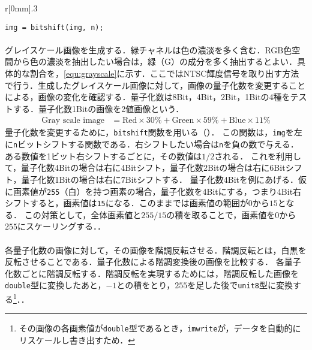\begin{wrapfigure}{r}[0mm]{.3\textwidth}
    \centering
    \vspace{-.7cm}
    \begin{lstlisting}[caption={\texttt{bitshift}関数},label={src:bitshift}]
img = bitshift(img, n);
    \end{lstlisting}
    \vspace{-.5cm}
\end{wrapfigure}
\paragraph{\kadaiab}
グレイスケール画像を生成する．緑チャネルは色の濃淡を多く含む．RGB色空間から色の濃淡を抽出したい場合は，緑（G）の成分を多く抽出するとよい．具体的な割合を，\eqref{equ:grayscale}に示す．ここではNTSC輝度信号を取り出す方法で行う．生成したグレイスケール画像に対して，画像の量子化数を変更することによる，画像の変化を確認する．量子化数は8Bit，4Bit，2Bit，1Bitの4種をテストする．量子化数1Bitの画像を2値画像という．
\begin{align}
    \textrm{Gray scale image} & = \textrm{Red}\times 30\% +\textrm{Green}\times 59\% +\textrm{Blue}\times 11\%\label{equ:grayscale}
\end{align}
量子化数を変更するために，\texttt{bitshift}関数を用いる（）．
この関数は，\texttt{img}を左に\texttt{n}ビットシフトする関数である．右シフトしたい場合は\texttt{n}を負の数で与える．
ある数値を1ビット右シフトするごとに，その数値は\(1/2\)される．
これを利用して，量子化数4Bitの場合は右に4Bitシフト，量子化数2Bitの場合は右に6Bitシフト，量子化数1Bitの場合は右に7Bitシフトする．
量子化数4Bitを例にあげる．仮に画素値が\texttt{255}（白）を持つ画素の場合，量子化数を4Bitにする，つまり4Bit右シフトすると，画素値は\texttt{15}になる．このままでは画素値の範囲が\(0\)から\(15\)となる．
この対策として，全体画素値と\(255/15\)の積を取ることで，画素値を\(0\)から\(255\)にスケーリングする．\scall{\kadaiab}．
\paragraph{\kadaiac}
各量子化数の画像に対して，その画像を階調反転させる．階調反転とは，白黒を反転させることである．量子化数による階調変換後の画像を比較する．
各量子化数ごとに階調反転する．階調反転を実現するためには，階調反転した画像を\texttt{double}型に変換したあと，\(-1\)との積をとり，\(255\)を足した後で\texttt{unit8}型に変換する\footnote{その画像の各画素値が\texttt{double}型であるとき，\texttt{imwrite}が，データを自動的にリスケールし書き出すため．}．\scall{\kadaiac}．

